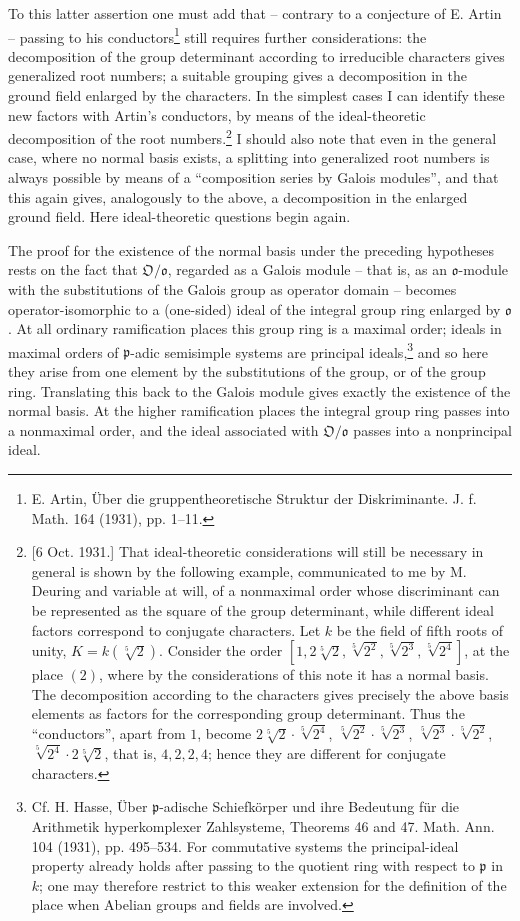 \documentclass[11pt]{article}
\providecommand{\frakO}{\mathfrak O}
\providecommand{\frako}{\mathfrak o}
\providecommand{\frakp}{\mathfrak p}
\begin{document}
To this latter assertion one must add that -- contrary to a conjecture of E. Artin -- passing to his conductors\footnote{E. Artin, Über die gruppentheoretische Struktur der Diskriminante. J. f. Math. 164 (1931), pp. 1--11.} still requires further considerations: the decomposition of the group determinant according to irreducible characters gives generalized root numbers; a suitable grouping gives a decomposition in the ground field enlarged by the characters. In the simplest cases I can identify these new factors with Artin's conductors, by means of the ideal-theoretic decomposition of the root numbers.\footnote{[6 Oct. 1931.] That ideal-theoretic considerations will still be necessary in general is shown by the following example, communicated to me by M. Deuring and variable at will, of a nonmaximal order whose discriminant can be represented as the square of the group determinant, while different ideal factors correspond to conjugate characters. Let \(k\) be the field of fifth roots of unity, \(K=k(\sqrt[5]{2})\). Consider the order \([1,2\sqrt[5]{2},\sqrt[5]{2^2},\sqrt[5]{2^3},\sqrt[5]{2^4}]\), at the place \((2)\), where by the considerations of this note it has a normal basis. The decomposition according to the characters gives precisely the above basis elements as factors for the corresponding group determinant. Thus the ``conductors'', apart from \(1\), become \(2\sqrt[5]{2}\cdot\sqrt[5]{2^4}\), \(\sqrt[5]{2^2}\cdot\sqrt[5]{2^3}\), \(\sqrt[5]{2^3}\cdot\sqrt[5]{2^2}\), \(\sqrt[5]{2^4}\cdot 2\sqrt[5]{2}\), that is, \(4,2,2,4\); hence they are different for conjugate characters.} I should also note that even in the general case, where no normal basis exists, a splitting into generalized root numbers is always possible by means of a ``composition series by Galois modules'', and that this again gives, analogously to the above, a decomposition in the enlarged ground field. Here ideal-theoretic questions begin again.

The proof for the existence of the normal basis under the preceding hypotheses rests on the fact that \(\frakO/\frako\), regarded as a Galois module -- that is, as an \(\frako\)-module with the substitutions of the Galois group as operator domain -- becomes operator-isomorphic to a (one-sided) ideal of the integral group ring enlarged by \(\frako\). At all ordinary ramification places this group ring is a maximal order; ideals in maximal orders of \(\frakp\)-adic semisimple systems are principal ideals,\footnote{Cf. H. Hasse, Über \(\frakp\)-adische Schiefkörper und ihre Bedeutung für die Arithmetik hyperkomplexer Zahlsysteme, Theorems 46 and 47. Math. Ann. 104 (1931), pp. 495--534. For commutative systems the principal-ideal property already holds after passing to the quotient ring with respect to \(\frakp\) in \(k\); one may therefore restrict to this weaker extension for the definition of the place when Abelian groups and fields are involved.} and so here they arise from one element by the substitutions of the group, or of the group ring. Translating this back to the Galois module gives exactly the existence of the normal basis. At the higher ramification places the integral group ring passes into a nonmaximal order, and the ideal associated with \(\frakO/\frako\) passes into a nonprincipal ideal.
\end{document}
